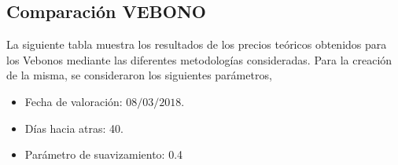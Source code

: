 \newpage

\subsection{Comparaci\'on VEBONO}\hspace{5cm}


\hspace{0.4cm}La siguiente tabla muestra los resultados de los precios te\'oricos obtenidos para los Vebonos mediante las diferentes metodolog\'ias consideradas. Para la creaci\'on de la misma, se consideraron los siguientes par\'ametros,

\begin{itemize}
  \item Fecha de valoraci\'on: $08/03/2018$.
  \item D\'ias hacia atras: 40.
  \item Par\'ametro de suavizamiento: 0.4
\end{itemize}

